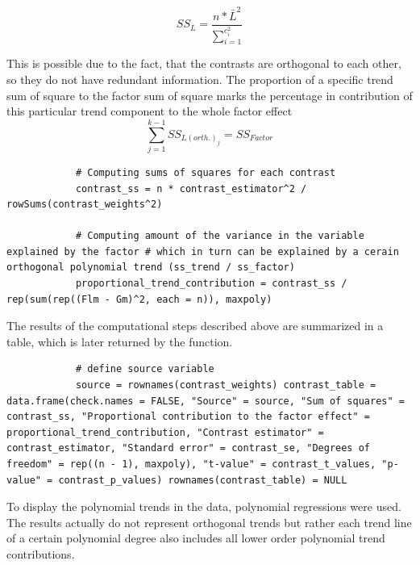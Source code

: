 \documentclass[11pt]{article}
\begin{document}
	
		\begin{equation}
			SS_L = \frac{n*\bar{L}^2}{\sum_{i=1}^{c_i^2}}
		\end{equation}
		
		\vspace{8 mm}
		
		This is possible due to the fact, that the contrasts are orthogonal to each other, so they do not have redundant information. The proportion of a specific trend sum of square to the factor sum of square marks the percentage in contribution of this particular trend component to the whole factor effect\\
		
		\begin{equation}
			\sum_{j=1}^{k-1}SS_{L(orth.)_j} = SS_{Factor}
		\end{equation}
					
		\vspace{8 mm}
		
		\begin{lstlisting}
			# Computing sums of squares for each contrast 
			contrast_ss = n * contrast_estimator^2 / rowSums(contrast_weights^2)
			
			# Computing amount of the variance in the variable explained by the factor # which in turn can be explained by a cerain orthogonal polynomial trend (ss_trend / ss_factor) 
			proportional_trend_contribution = contrast_ss / rep(sum(rep((Flm - Gm)^2, each = n)), maxpoly)
		\end{lstlisting}
		
		The results of the computational steps described above are summarized in a table, which is later returned by the function.
		
		\begin{lstlisting}
			# define source variable 
			source = rownames(contrast_weights) contrast_table = data.frame(check.names = FALSE, "Source" = source, "Sum of squares" = contrast_ss, "Proportional contribution to the factor effect" = proportional_trend_contribution, "Contrast estimator" = contrast_estimator, "Standard error" = contrast_se, "Degrees of freedom" = rep((n - 1), maxpoly), "t-value" = contrast_t_values, "p-value" = contrast_p_values) rownames(contrast_table) = NULL
		\end{lstlisting}
			
		To display the polynomial trends in the data, polynomial regressions were used. The results actually do not represent orthogonal trends but rather each trend line of a certain polynomial degree also includes all lower order polynomial trend contributions.\\
		
\end{document}
